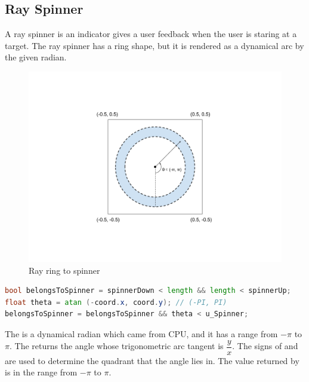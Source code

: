 \subsection{Ray Spinner}
\label{section:ray-spinner}

A ray spinner is an indicator gives a user feedback when the user is staring at a target. The ray spinner has a ring shape, but it is rendered as a dynamical arc by the given radian.

\begin{figure}[H]
\caption{Ray ring to spinner}
\label{fig:ray-ring2spinner}
\centering
\includegraphics[width=\textwidth, keepaspectratio]{Figures/ray-ring2spinner.png}
\decoRule
\end{figure}

\begin{lstlisting}[language=Glsl]
bool belongsToSpinner = spinnerDown < length && length < spinnerUp;
float theta = atan (-coord.x, coord.y); // (-PI, PI)
belongsToSpinner = belongsToSpinner && theta < u_Spinner;
\end{lstlisting}

The  is a dynamical radian which came from CPU, and it has a range from $-\pi$ to $\pi$. The  returns the angle whose trigonometric arc tangent is $\dfrac{y}{x}$. The signs of  and  are used to determine the quadrant that the angle lies in. The value returned by  is in the range from $-\pi$ to $\pi$.

